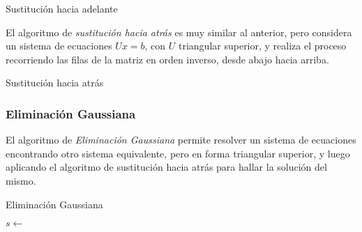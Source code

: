         \vspace*{1em}
        \begin{algorithm}[H]
          \caption{Sustitución hacia adelante}
        \end{algorithm}
        \vspace*{1em}

        El algoritmo de \emph{sustitución hacia atrás} es muy similar al anterior, pero considera un sistema de ecuaciones $Ux=b$, con $U$ triangular superior, y realiza el proceso recorriendo las filas de la matriz en orden inverso, desde abajo hacia arriba.

        \vspace*{1em}
        \begin{algorithm}[H]
          \caption{Sustitución hacia atrás}
        \end{algorithm}
        \vspace*{1em}

      \subsubsection*{Eliminación Gaussiana}

        El algoritmo de \emph{Eliminación Gaussiana} permite resolver un sistema de ecuaciones encontrando otro sistema equivalente, pero en forma triangular superior, y luego aplicando el algoritmo de sustitución hacia atrás para hallar la solución del mismo.

        \begin{algorithm}[H]
          \caption{Eliminación Gaussiana}
          $s \gets$  \;
        \end{algorithm}

